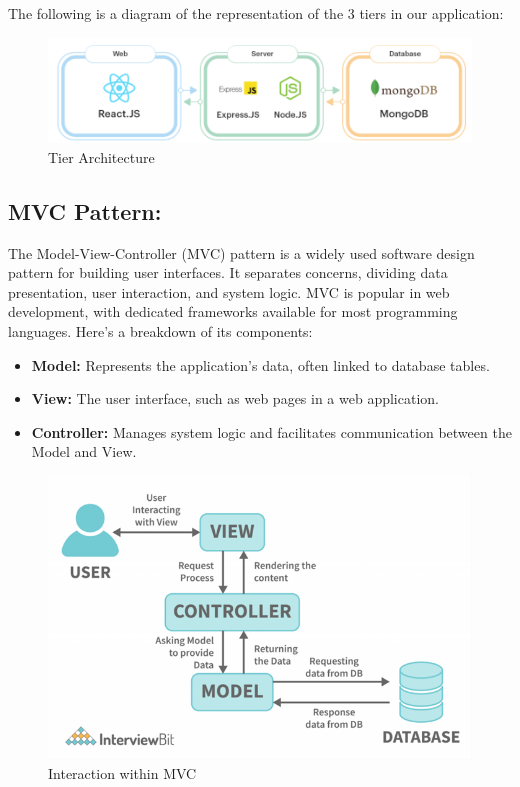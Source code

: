 The following is a diagram of the representation of the 3 tiers in our application:

\begin{figure}[!h]
\begin{center}
\includegraphics{images/Tier Architecture.png}
\end{center}
\caption{Tier Architecture}
\end{figure}

\subsection{MVC Pattern:}

The Model-View-Controller (MVC) pattern is a widely used software design pattern for building user interfaces. It separates concerns, dividing data presentation, user interaction, and system logic. MVC is popular in web development, with dedicated frameworks available for most programming languages. Here's a breakdown of its components:

\begin{itemize}[label=\textbullet]
    \item \textbf{Model:} Represents the application's data, often linked to database tables.
    \item \textbf{View:} The user interface, such as web pages in a web application.
    \item \textbf{Controller:} Manages system logic and facilitates communication between the Model and View.
\end{itemize}

\begin{figure}[!h]
\begin{center}
\includegraphics[width=12cm]{images/Interaction within MVC.png}
\end{center}
\caption{Interaction within MVC}
\end{figure}

